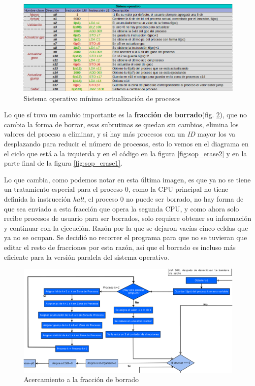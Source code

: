 \documentclass[letterpaper,12pt,oneside]{book}
\begin{document}
			\begin{figure}[H]		
				\centering
				\includegraphics[scale=0.53]{media/Paralela/sop_update.png}
				\caption{Sistema operativo mínimo actualización de procesos}
				\label{fig:sop_update}
			\end{figure}



			Lo que sí tuvo un cambio importante es la \textbf{fracción de borrado}(fig. \ref{fig:diag_somp_erase}), que no cambia la forma de borrar, esas subrutinas se quedan
			sin cambios, elimina los valores del proceso a eliminar, y si hay más procesos con un \textit{ID} mayor los va desplazando para reducir el número
			de procesos, esto lo vemos en el diagrama en el ciclo que está a la izquierda y en el código en la figura \ref{fig:sop_erase2} y en la parte
			final de la figura \ref{fig:sop_erase1}.
   
            Lo que cambia, como podemos notar en esta última imagen, es que ya no se tiene un tratamiento especial
			para el proceso 0, como la CPU principal no tiene definida la instrucción \textit{halt}, el proceso 0 no puede ser borrado, no hay forma
			de que sea enviado a esta fracción que opera la segunda CPU, y como ahora solo recibe procesos de usuario para ser borrados, solo requiere obtener
			su información y continuar con la ejecución. Razón por la que se dejaron vacías cinco celdas que ya no se ocupan. Se decidió no recorrer el programa
			para que no se tuvieran que editar el resto de fracciones por esta razón, así que el borrado es incluso más eficiente para
			la versión paralela del sistema operativo.
			


			
			\begin{figure}[H]		
				\centering
				\includegraphics[scale=0.32]{media/Paralela/diag_somp_erase.png}
				\caption{Acercamiento a la fracción de borrado}
				\label{fig:diag_somp_erase}
			\end{figure}	
			
\end{document}
